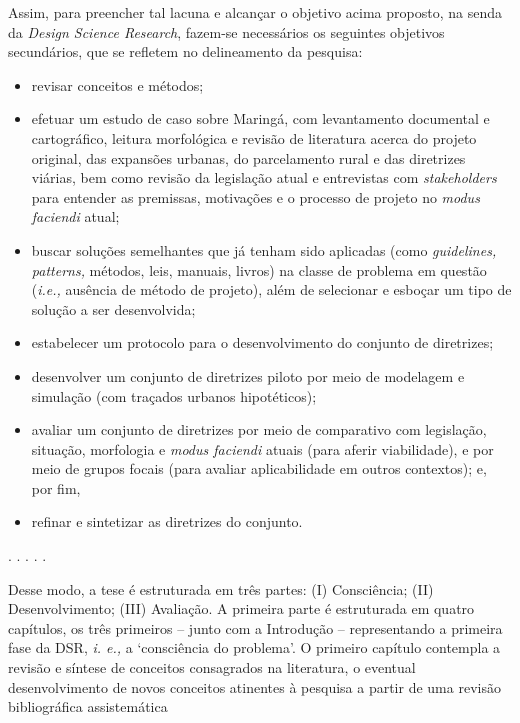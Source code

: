 \documentclass[]{report}
\begin{document}
	Assim, para preencher tal lacuna e alcançar o objetivo acima proposto, na senda da \textit{Design Science Research}, fazem-se necessários os seguintes objetivos secundários, que se refletem no delineamento da pesquisa: 
	\begin{itemize}
		\item revisar conceitos e métodos; 
		\item efetuar um estudo de caso sobre Maringá, com levantamento documental e cartográfico, leitura morfológica e revisão de literatura acerca do projeto original, das expansões urbanas, do parcelamento rural e das diretrizes viárias, bem como revisão da legislação atual e entrevistas com \textit{stakeholders} para entender as premissas, motivações e o processo de projeto no \textit{modus faciendi} atual; 
		\item buscar soluções semelhantes que já tenham sido aplicadas (como \textit{guidelines, patterns,} métodos, leis, manuais, livros) na classe de problema em questão (\textit{i.e.,} ausência de método de projeto), além de selecionar e esboçar um tipo de solução a ser desenvolvida;
		\item estabelecer um protocolo para o desenvolvimento do conjunto de diretrizes; 
		\item desenvolver um conjunto de diretrizes piloto por meio de modelagem e simulação (com traçados urbanos hipotéticos); 
		\item avaliar um conjunto de diretrizes por meio de comparativo com legislação, situação, morfologia e \textit{modus faciendi} atuais (para aferir viabilidade), e por meio de grupos focais (para avaliar aplicabilidade em outros contextos); e, por fim, 
		\item refinar e sintetizar as diretrizes do conjunto.
	\end{itemize}

	\begin{center}
		. . . . .
	\end{center}

	Desse modo, a tese é estruturada em três partes: (I) Consciência; (II) Desenvolvimento; (III) Avaliação. A primeira parte é estruturada em quatro capítulos, os três primeiros – junto com a Introdução – representando a primeira fase da DSR, \textit{i. e.,} a `consciência do problema'. O primeiro capítulo contempla a revisão e síntese de conceitos consagrados na literatura, o eventual desenvolvimento de novos conceitos atinentes à pesquisa a partir de uma revisão bibliográfica assistemática
\end{document}
